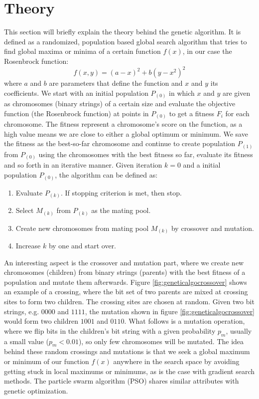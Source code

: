 \section{Theory}\label{sec:theory}

This section will briefly explain the theory behind the genetic algorithm. It is defined as a randomized, population based global search algorithm that tries to find global maxima or minima of a certain function $f(x)$, in our case the Rosenbrock function: $$f(x,y) = (a-x)^2+b(y-x^2)^2$$ where $a$ and $b$ are parameters that define the function and $x$ and $y$ its coefficients. We start with an initial population $P_{(0)}$ in which $x$ and $y$ are given as chromosomes (binary strings) of a certain size and evaluate the objective function (the Rosenbrock function\cite{Shang2006}) at points in $P_{(0)}$ to get a fitness $F_{i}$ for each chromosome. The fitness represent a chromosome's score on the function, as a high value means we are close to either a global optimum or minimum. We save the fitness as the best-so-far chromosome and continue to create population $P_{(1)}$ from $P_{(0)}$ using the chromosomes with the best fitness so far, evaluate its fitness and so forth in an iterative manner. Given iteration $k=0$ and a initial population $P_{(0)}$, the algorithm can be defined as\cite{Chong2013}:

\begin{enumerate}
	\item Evaluate $P_{(k)}$. If stopping criterion is met, then stop.
	\item Select $M_{(k)}$ from $P_{(k)}$ as the mating pool.
	\item Create new chromosomes from mating pool $M_{(k)}$ by crossover and mutation.
	\item Increase $k$ by one and start over.
\end{enumerate}

An interesting aspect is the crossover and mutation part, where we create new chromosomes (children) from binary strings (parents) with the best fitness of a population and mutate them afterwards. Figure \ref{fig:geneticalgocrossover} shows an example of a crossing, where the bit set of two parents are mixed at crossing sites to form two children. The crossing sites are chosen at random. Given two bit strings, e.g. $0000$ and $1111$, the mutation shown in figure \ref{fig:geneticalgocrossover} would form two children $1001$ and $0110$. What follows is a mutation operation, where we flip bits in the children's bit string with a given probability $p_{m}$, usually a small value ($p_{m} < 0.01$), so only few chromosomes will be mutated. The idea behind these random crossings and mutations is that we seek a global maximum or minimum of our function $f(x)$ anywhere in the search space by avoiding getting stuck in local maximums or minimums, as is the case with gradient search methods. The particle swarm algorithm (PSO) shares similar attributes with genetic optimization.

